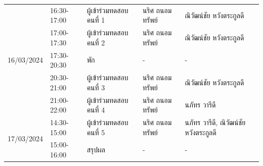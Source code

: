 \begin{enumerate}
\begin{table}[H]
\begin{tabular}{|r|l|l|l|l|}
            \multirow[t]{5}{*}{16/03/2024}           & 16:30-17:00          & ผู้เข้าร่วมทดสอบ คนที่ 1 & นริศ ถนอมทรัพย์      & ณิวัฒน์ชัย หวังตระกูลดี               \\ \cline{2-5} 
                                                & 17:00-17:30          & ผู้เข้าร่วมทดสอบ คนที่ 2 & นริศ ถนอมทรัพย์      & ณิวัฒน์ชัย หวังตระกูลดี               \\ \cline{2-5} 
                                                & 17:30-20:30          & พัก                      & -                    & -                                     \\ \cline{2-5} 
                                                & 20:30-21:00          & ผู้เข้าร่วมทดสอบ คนที่ 3 & นริศ ถนอมทรัพย์      & ณิวัฒน์ชัย หวังตระกูลดี               \\ \cline{2-5} 
                                                & 21:00-22:00          & ผู้เข้าร่วมทดสอบ คนที่ 4 & นริศ ถนอมทรัพย์      & นภัทร วารีดี                          \\ \hline
            \multirow[t]{2}{*}{17/03/2024}           & 14:30-15:00          & ผู้เข้าร่วมทดสอบ คนที่ 5 & นริศ ถนอมทรัพย์      & นภัทร วารีดี, ณิวัฒน์ชัย หวังตระกูลดี \\ \cline{2-5} 
                                                & 15:00-16:00          & สรุปผล                   & -                    & -                                     \\ \hline
            \end{tabular}
            \end{table}
\end{enumerate}
